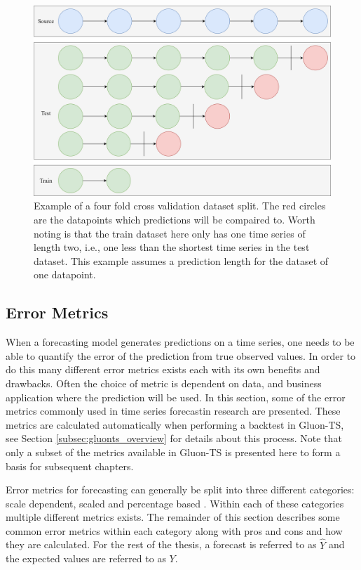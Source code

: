 \begin{figure}[htb]
  \centering
  \includegraphics[width=\linewidth]{./img/k_fold_validation.png}
  \caption{Example of a four fold cross validation dataset split. The red circles are the datapoints which predictions will be compaired to. Worth noting is that the train dataset here only has one time series of length two, i.e., one less than the shortest time series in the test dataset. This example assumes a prediction length for the dataset of one datapoint.}
  \label{fig:k_fold_validation}
  \endminipage\hfill
\end{figure}

\subsection{Error Metrics}
\label{subsec:error_metrics}
When a forecasting model generates predictions on a time series, one needs to be able to quantify the error of the prediction from true observed values. In order to do this many different error metrics exists each with its own benefits and drawbacks. Often the choice of metric is dependent on data, and business application where the prediction will be used. In this section, some of the error metrics commonly used in time series forecastin research are presented. These metrics are calculated automatically when performing a backtest in Gluon-TS, see Section \ref{subsec:gluonts_overview} for details about this process. Note that only a subset of the metrics available in Gluon-TS is presented here to form a basis for subsequent chapters.

Error metrics for forecasting can generally be split into three different categories: scale dependent, scaled and percentage based \cite{hyndman_forecasting_3rd,goodwin_asymmetry_1999}. Within each of these categories multiple different metrics exists. The remainder of this section describes some common error metrics within each category along with pros and cons and how they are calculated. For the rest of the thesis, a forecast is referred to as \(\hat{Y}\) and the expected values are referred to as \(Y\).

